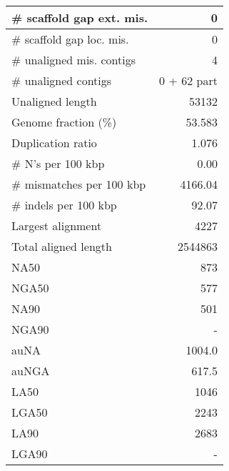 \documentclass[12pt,a4paper]{article}
\begin{document}
\begin{table}[ht]
\begin{center}
\begin{tabular}{|l*{1}{|r}|}
\# scaffold gap ext. mis. & 0 \\ \hline
\# scaffold gap loc. mis. & 0 \\ \hline
\# unaligned mis. contigs & 4 \\ \hline
\# unaligned contigs & 0 + 62 part \\ \hline
Unaligned length & 53132 \\ \hline
Genome fraction (\%) & 53.583 \\ \hline
Duplication ratio & 1.076 \\ \hline
\# N's per 100 kbp & 0.00 \\ \hline
\# mismatches per 100 kbp & 4166.04 \\ \hline
\# indels per 100 kbp & 92.07 \\ \hline
Largest alignment & 4227 \\ \hline
Total aligned length & 2544863 \\ \hline
NA50 & 873 \\ \hline
NGA50 & 577 \\ \hline
NA90 & 501 \\ \hline
NGA90 & - \\ \hline
auNA & 1004.0 \\ \hline
auNGA & 617.5 \\ \hline
LA50 & 1046 \\ \hline
LGA50 & 2243 \\ \hline
LA90 & 2683 \\ \hline
LGA90 & - \\ \hline
\end{tabular}
\end{center}
\end{table}
\end{document}
